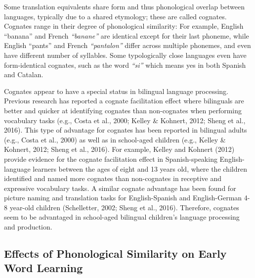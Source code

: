 \documentclass[
  english,
  ,man,floatsintext]{apa6}
\begin{document}
Some translation equivalents share form and thus phonological overlap between languages, typically due to a shared etymology; these are called cognates. Cognates range in their degree of phonological similarity: For example, English ``banana'' and French \emph{``banane''} are identical except for their last phoneme, while English ``pants'' and French \emph{``pantalon''} differ across multiple phonemes, and even have different number of syllables. Some typologically close languages even have form-identical cognates, such as the word \emph{``si''} which means yes in both Spanish and Catalan.

Cognates appear to have a special status in bilingual language processing. Previous research has reported a cognate facilitation effect where bilinguals are better and quicker at identifying cognates than non-cognates when performing vocabulary tasks (e.g., Costa et al., 2000; Kelley \& Kohnert, 2012; Sheng et al., 2016). This type of advantage for cognates has been reported in bilingual adults (e.g., Costa et al., 2000) as well as in school-aged children (e.g., Kelley \& Kohnert, 2012; Sheng et al., 2016). For example, Kelley and Kohnert (2012) provide evidence for the cognate facilitation effect in Spanish-speaking English-language learners between the ages of eight and 13 years old, where the children identified and named more cognates than non-cognates in receptive and expressive vocabulary tasks. A similar cognate advantage has been found for picture naming and translation tasks for English-Spanish and English-German 4-8 year-old children (Schelletter, 2002; Sheng et al., 2016). Therefore, cognates seem to be advantaged in school-aged bilingual children's language processing and production.

\hypertarget{effects-of-phonological-similarity-on-early-word-learning}{%
\subsection{Effects of Phonological Similarity on Early Word Learning}\label{effects-of-phonological-similarity-on-early-word-learning}}
\end{document}
